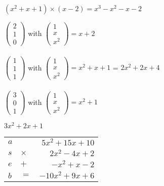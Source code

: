 \documentclass[11pt]{article}
\begin{document}
$(x^2+x+1) \times (x-2) = x^3-x^2-x-2$

\newpage

$
\begin{pmatrix} 2\\ 1\\ 0 \end{pmatrix}$ with $\begin{pmatrix} 1\\ x\\ x^2 \end{pmatrix} = x + 2$\\\\

$ \begin{pmatrix} 1\\ 1 \\1 \end{pmatrix}$ with $\begin{pmatrix} 1\\ x\\ x^2 \end{pmatrix} = x^2+x+1$ \hspace{1cm} = $2x^2+2x+4$\\\\

$ \begin{pmatrix} 3\\ 0 \\1 \end{pmatrix}$ with $\begin{pmatrix} 1\\ x\\ x^2 \end{pmatrix} = x^2+1$\

\newpage

\begin{center}
	$3x^2+2x+1$
\end{center}

\newpage

\begin{center}
	\begin{tabular}{l l r}
		$a$ & & $5x^2+15x+10$ \\
		$s$ & $\times$ & $2x^2-4x+2$ \\
		$e$ & $+$ & $-x^2+x-2$  \\ \hline
		$b$ & $=$ & $-10x^2+9x+6$
	\end{tabular}
\end{center}
\end{document}

